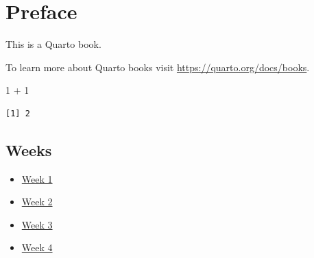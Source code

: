 \documentclass[
  letterpaper,
  DIV=11,
  numbers=noendperiod]{scrreprt}
\author{}
\date{}
\newenvironment{Shaded}{\begin{snugshade}}{\end{snugshade}}
\newcommand{\DecValTok}[1]{\textcolor[rgb]{0.68,0.00,0.00}{#1}}
\newcommand{\SpecialCharTok}[1]{\textcolor[rgb]{0.37,0.37,0.37}{#1}}
\providecommand{\tightlist}{%
  \setlength{\itemsep}{0pt}\setlength{\parskip}{0pt}}
\begin{document}
\chapter*{Preface}\label{preface}

This is a Quarto book.

To learn more about Quarto books visit
\url{https://quarto.org/docs/books}.

\begin{Shaded}
\begin{Highlighting}[]
\DecValTok{1} \SpecialCharTok{+} \DecValTok{1}
\end{Highlighting}
\end{Shaded}

\begin{verbatim}
[1] 2
\end{verbatim}

\section{Weeks}\label{weeks}

\begin{itemize}
\tightlist
\item
  \href{weeks/week1.html}{Week 1}
\item
  \href{weeks/week2.html}{Week 2}
\item
  \href{weeks/week3.html}{Week 3}
\item
  \href{weeks/week4.html}{Week 4}
\end{itemize}
\end{document}
